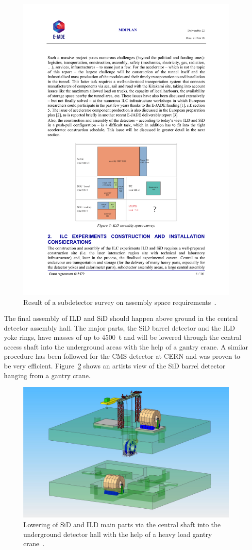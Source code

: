 \begin{figure}[h!]
\centering
\includegraphics[width=0.8\hsize]{Integration/fig/assembly_space_survey.pdf}
\caption{\label{fig:integration:assembly_space}Result of a subdetector survey on assembly space requirements~\cite{ild:bib:ejade_mdi}.}
\end{figure}

The final assembly of ILD and SiD should happen above ground in the central detector assembly hall. The major parts, the SiD barrel detector and the ILD yoke rings, have masses of up to 4500~t and will be lowered through the central access shaft into the underground areas with the help of a gantry crane. A similar procedure has been followed for the CMS detector at CERN and was proven to be very efficient. Figure~\ref{fig:integration:gantry_crane} shows an artists view of the SiD barrel detector hanging from a gantry crane.
\begin{figure}[h!]
\centering
\includegraphics[width=0.8\hsize]{Integration/fig/gantry_crane.png}
\caption{\label{fig:integration:gantry_crane}Lowering of SiD and ILD main parts via the central shaft into the underground detector hall with the help of a heavy load gantry crane~\cite{ild:bib:gantry_crane}.}
\end{figure}

